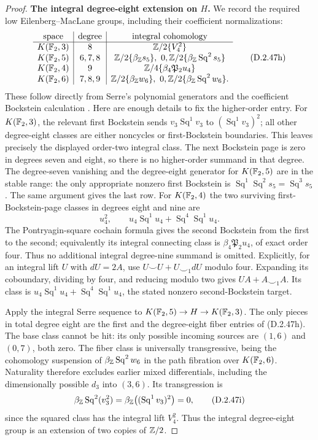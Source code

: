 \begin{proof}
\medskip\noindent
\textbf{The integral degree-eight extension on $H$.}
We record the required low Eilenberg--MacLane groups, including
their coefficient normalizations:
\[
\begin{array}{c|c|c}
\text{space}&\text{degree}&\text{integral cohomology}\\ \hline
K(\mathbb F_2,3)&8&\mathbb Z/2\{V_4^2\}\\
K(\mathbb F_2,5)&6,7,8&
 \mathbb Z/2\{\beta_{\mathbb Z}s_5\},\ 0,
 \mathbb Z/2\{\beta_{\mathbb Z}\operatorname{Sq}^2s_5\}\\
K(\mathbb F_2,4)&9&\mathbb Z/4\{\beta_4\mathfrak P_2u_4\}\\
K(\mathbb F_2,6)&7,8,9&
 \mathbb Z/2\{\beta_{\mathbb Z}w_6\},\ 0,
 \mathbb Z/2\{\beta_{\mathbb Z}\operatorname{Sq}^2w_6\}.
\end{array}
\tag{D.2.47h}
\]
These follow directly from Serre's polynomial generators and
the coefficient Bockstein calculation
\cite[\S2, nos.~7--11, pp.~201--205]{I_Serre1953}.
Here are enough details to fix the higher-order entry.
For $K(\mathbb F_2,3)$, the relevant first Bockstein sends
$v_3\operatorname{Sq}^1v_3$ to
$(\operatorname{Sq}^1v_3)^2$; all other degree-eight
classes are either noncycles or first-Bockstein boundaries.
This leaves precisely the displayed order-two integral class.
The next Bockstein page is zero in degrees seven and eight,
so there is no higher-order summand in that degree.
The degree-seven vanishing and the degree-eight generator for
$K(\mathbb F_2,5)$ are in the stable range: the only appropriate
nonzero first Bockstein is
$\operatorname{Sq}^1\operatorname{Sq}^2s_5
=\operatorname{Sq}^3s_5$. The same argument gives the last row.
For $K(\mathbb F_2,4)$ the two surviving first-Bockstein-page classes
in degrees eight and nine are
\[
 u_4^2,\qquad
 u_4\operatorname{Sq}^1u_4+
       \operatorname{Sq}^4\operatorname{Sq}^1u_4.
\]
The Pontryagin-square cochain formula gives the second
Bockstein from the first to the second; equivalently its
integral connecting class is
$\beta_4\mathfrak P_2u_4$, of exact order four. Thus no
additional integral degree-nine summand is omitted.
Explicitly, for an integral lift $U$ with $dU=2A$, use
$U\smile U+U\smile_1dU$ modulo four. Expanding its
coboundary, dividing by four, and reducing modulo two gives
$UA+A\smile_1A$. Its class is
$u_4\operatorname{Sq}^1u_4+
\operatorname{Sq}^4\operatorname{Sq}^1u_4$, the stated
nonzero second-Bockstein target.

Apply the integral Serre sequence to
$K(\mathbb F_2,5)\to H\to K(\mathbb F_2,3)$.
The only pieces in total degree eight are the first and the
degree-eight fiber entries of \textup{(D.2.47h)}.
The base class cannot be hit: its only possible incoming
sources are $(1,6)$ and $(0,7)$, both zero.
The fiber class is universally transgressive, being the
cohomology suspension of
$\beta_{\mathbb Z}\operatorname{Sq}^2w_6$ in the path fibration
over $K(\mathbb F_2,6)$. Naturality therefore excludes earlier
mixed differentials, including the dimensionally possible
$d_3$ into $(3,6)$. Its transgression is
\[
 \beta_{\mathbb Z}\operatorname{Sq}^2(v_3^2)
       =\beta_{\mathbb Z}\bigl((\operatorname{Sq}^1v_3)^2\bigr)=0,
 \tag{D.2.47i}
\]
since the squared class has the integral lift $V_4^2$.
Thus the integral degree-eight group is an extension of
two copies of $\mathbb Z/2$.


\end{proof}
